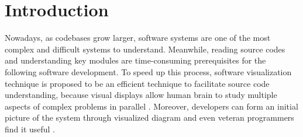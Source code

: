\documentclass{sig-alternate}
\begin{document}
\section{Introduction}

Nowadays, as codebases grow larger, software systems are one of the most complex and difficult systems to understand.
Meanwhile, reading source codes and understanding key modules are time-consuming prerequisites for the following software development.
To speed up this process, software visualization technique is proposed to be an efficient technique
to facilitate source code understanding, because visual displays allow human brain to study
multiple aspects of complex problems in parallel \cite{petre1995looking}.
Moreover, developers can form an initial picture of the system through visualized diagram \cite{lanza2003object}
and even veteran programmers find it useful \cite{kim2012field}. 
\end{document}
